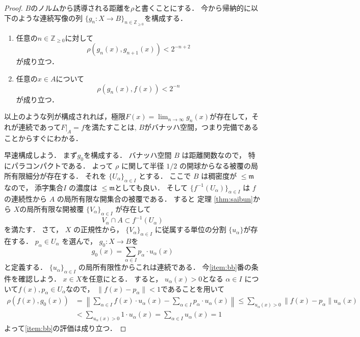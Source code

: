 \documentclass[leqno, a4paper, 12pt]{jsarticle}
\newcommand{\zz}{\mathbb{Z}}
\begin{document}
\begin{proof}
$B$のノルムから誘導される距離を$\rho$と書くことにする．
今から帰納的に以下のような連続写像の列
$\{g_{n}\colon X\to B\}_{n\in \zz_{\ge 0}}$を構成する．
\begin{enumerate}
\item\label{item:aa}
任意の$n\in \zz_{\ge 0}$に対して
\[
\rho(g_{n}(x), g_{n+1}(x))<2^{-n+2}
\]が成り立つ．

\item\label{item:bb}
任意の$x\in A$について
\[
\rho(g_{n}(x), f(x))<2^{-n}
\]
が成り立つ．
\end{enumerate}
以上のような列が構成されれば，極限$F(x)=\lim_{n\to\infty}g_{n}(x)$が存在して，それが連続であって$F|_{A}=f$を満たすことは, $B$がバナッハ空間，つまり完備であることからすぐにわかる．

早速構成しよう．
まず$g_{0}$を構成する．
バナッハ空間
$B$
は距離関数なので，
特にパラコンパクトである．
よって
$\rho$
に関して半径
$1/2$
の開球からなる被覆の局所有限細分が存在する．
それを
$\{U_{\alpha}\}_{\alpha\in I}$
とする．
ここで
$B$
は稠密度が
$\le \mathfrak{m}$
なので，
添字集合$I$
の濃度は
$\le \mathfrak{m}$としても良い．
そして
$\{f^{-1}(U_{\alpha})\}_{\alpha\in I}$
は
$f$
の連続性から
$A$
の局所有限な開集合の被覆である．
すると
定理
\ref{thm:saibun}から
$X$の局所有限な開被覆
$\{V_{\alpha}\}_{\alpha\in I}$
が存在して
\[
V_{\alpha}\cap A\subset f^{-1}(U_{\alpha})
\]
を満たす．
さて，
$X$
の正規性から，
$\{V_{\alpha}\}_{\alpha\in I}$
に従属する単位の分割
$\{u_{\alpha}\}$が存在する．
$p_{\alpha}\in U_{\alpha}$
を選んで，
$g_{0}\colon X\to B$を
\[
g_{0}(x)=\sum_{\alpha\in I}p_{\alpha}\cdot u_{\alpha}(x)
\]
と定義する．
$\{u_{\alpha}\}_{\alpha\in I}$
の局所有限性からこれは連続である．
今\ref{item:bb}番の条件を確認しよう．
$x\in X$を任意にとる．
すると，
$u_{\alpha}(x)>0$となる
$\alpha\in I$
について$f(x), p_{\alpha}\in U_{\alpha}$なので，
$\|f(x)-p_{\alpha}\|<1$であることを用いて
\begin{align*}
\rho(f(x), g_{0}(x))&=\left\|\sum_{\alpha\in I}f(x)
\cdot u_{\alpha}(x)-
\sum_{\alpha\in I}p_{\alpha}\cdot u_{\alpha}(x)\right\|
\le \sum_{u_{\alpha}(x)>0}\|f(x)-p_{\alpha}\|u_{\alpha}(x)\\
&<\sum_{u_{\alpha}(x)>0} 1\cdot  u_{\alpha}(x)=
\sum_{\alpha\in I} u_{\alpha}(x)=1
\end{align*}
よって\ref{item:bb}の評価は成り立つ．


\end{proof}
\end{document}
